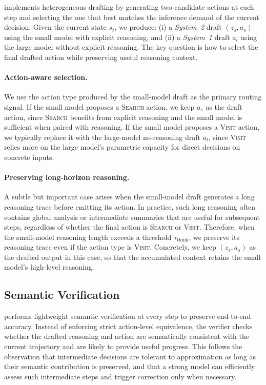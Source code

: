\method{} implements heterogeneous drafting by generating two candidate actions at each step and selecting the one that best matches the inference demand of the current decision.
Given the current state $s_t$, we produce:
(i) a \textit{System~2} draft $(z_s, a_s)$ using the small model with explicit reasoning, and
(ii) a \textit{System~1} draft $a_l$ using the large model without explicit reasoning.
The key question is how to select the final drafted action while preserving useful reasoning context.

\paragraph{Action-aware selection.}
We use the action type produced by the small-model draft as the primary routing signal.
If the small model proposes a \textsc{Search} action, we keep $a_s$ as the draft action, since \textsc{Search} benefits from explicit reasoning and the small model is sufficient when paired with reasoning.
If the small model proposes a \textsc{Visit} action, we typically replace it with the large-model no-reasoning draft $a_l$, since \textsc{Visit} relies more on the large model’s parametric capacity for direct decisions on concrete inputs.

\paragraph{Preserving long-horizon reasoning.}
A subtle but important case arises when the small-model draft generates a long reasoning trace before emitting its action.
In practice, such long reasoning often contains global analysis or intermediate summaries that are useful for subsequent steps, regardless of whether the final action is \textsc{Search} or \textsc{Visit}.
Therefore, when the small-model reasoning length exceeds a threshold $\tau_{\text{think}}$, we preserve its reasoning trace even if the action type is \textsc{Visit}.
Concretely, we keep $(z_s, a_s)$ as the drafted output in this case, so that the accumulated context retains the small model’s high-level reasoning.


\subsection{Semantic Verification}
\label{subsec:semantic_verification}

 \method{} performs lightweight semantic verification at every step to preserve end-to-end accuracy.
Instead of enforcing strict action-level equivalence, the verifier checks whether the drafted reasoning and action are semantically consistent with the current trajectory and are likely to provide useful progress.
This follows the observation that intermediate decisions are tolerant to approximation as long as their semantic contribution is preserved, and that a strong model can efficiently assess such intermediate steps and trigger correction only when necessary.

